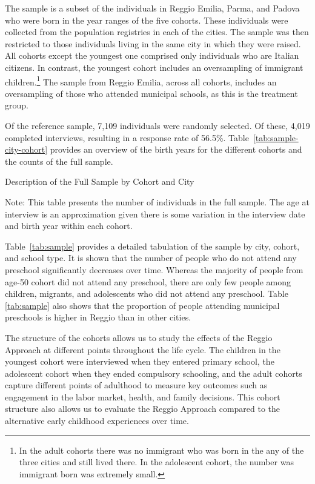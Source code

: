 The sample is a subset of the individuals in Reggio Emilia, Parma, and Padova who were born in the year ranges of the five cohorts.  These individuals were collected from the population registries in each of the cities. The sample was then restricted to those individuals living in the same city in which they were raised. All cohorts except the youngest one comprised only individuals who are Italian citizens. In contrast, the youngest cohort includes an oversampling of immigrant children.\footnote{In the adult cohorts there was no immigrant who was born in the any of the three cities and still lived there. In the adolescent cohort, the number was immigrant born was extremely small.} The sample from Reggio Emilia, across all cohorts, includes an oversampling of those who attended municipal schools, as this is the treatment group.

Of the reference sample, 7,109 individuals were randomly selected. Of these, 4,019 completed interviews, resulting in a response rate of 56.5\%. Table~\ref{tab:sample-city-cohort} provides an overview of the birth years for the different cohorts and the counts of the full sample.
\begin{table}[H]
\centering
\begin{threeparttable}
	\caption{Description of the Full Sample by Cohort and City}\label{tab:sample-city-cohort}
	
\begin{tablenotes}
\footnotesize
Note: This table presents the number of individuals in the full sample. The age at interview is an approximation given there is some variation in the interview date and birth year within each cohort.
\end{tablenotes}
\end{threeparttable}
\end{table}

Table~\ref{tab:sample} provides a detailed tabulation of the sample by city, cohort, and school type. It is shown that the number of people who do not attend any preschool significantly decreases over time. Whereas the majority of people from age-50 cohort did not attend any preschool, there are only few people among children, migrants, and adolescents who did not attend any preschool. Table \ref{tab:sample} also shows that the proportion of people attending municipal preschools is higher in Reggio than in other cities. 

The structure of the cohorts allows us to study the effects of the Reggio Approach at different points throughout the life cycle. The children in the youngest cohort were interviewed when they entered primary school, the adolescent cohort when they ended compulsory schooling, and the adult cohorts capture different points of adulthood to measure key outcomes such as engagement in the labor market, health, and family decisions. This cohort structure also allows us to evaluate the Reggio Approach compared to the alternative early childhood experiences over time.


